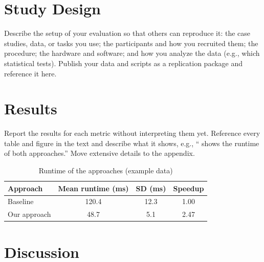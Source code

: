 \section{Study Design}\label{sec:evaluation:design}

Describe the setup of your evaluation so that others can reproduce it:
the case studies, data, or tasks you use; the participants and how you recruited them; the procedure; the hardware and software; and how you analyze the data (e.g., which statistical tests).
Publish your data and scripts as a replication package and reference it here.

\section{Results}\label{sec:evaluation:results}

Report the results for each metric without interpreting them yet.
Reference every table and figure in the text and describe what it shows, e.g., \enquote{ shows the runtime of both approaches.}
Move extensive details to the appendix.

\begin{table}[htbp]
  \centering
  \caption{Runtime of the approaches (example data)}
  \label{tab:evaluation:results}
  \begin{tabular}{@{}l S[table-format=3.1] S[table-format=2.1] S[table-format=1.2]@{}}
    \toprule
    Approach & {Mean runtime (\unit{\milli\second})} & {SD (\unit{\milli\second})} & {Speedup} \\
    \midrule
    Baseline      & 120.4 & 12.3 & 1.00 \\
    Our approach  &  48.7 &  5.1 & 2.47 \\
    \bottomrule
  \end{tabular}
\end{table}

\section{Discussion}\label{sec:evaluation:discussion}

